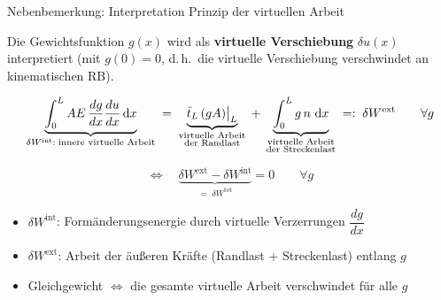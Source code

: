 \documentclass[aspectratio=169,professionalfonts]{beamer}
\newcommand{\dd}{\,\mathrm{d}}
\begin{document}
\begin{frame}{Nebenbemerkung: Interpretation Prinzip der virtuellen Arbeit}

  \small
  Die Gewichtsfunktion $g(x)$ wird als \textbf{virtuelle Verschiebung} $\delta u(x)$ interpretiert
  (mit $g(0)=0$, d.\,h.\ die virtuelle Verschiebung verschwindet an kinematischen RB).

  \vspace{1.0em}
  \begin{center}
  \[
    \underbrace{%
      \int_0^L AE\,\frac{dg}{dx}\frac{du}{dx}\dd x
    }_{\delta W^{\mathrm{int}}:\;\text{innere virtuelle Arbeit}}
    \;=\;
    \underbrace{%
      \bar{t}_L\,(gA)\big|_L
    }_{\substack{\text{virtuelle Arbeit}\\\text{der Randlast}}}
    \;+\;
    \underbrace{%
      \int_0^L g\,n\,\dd x
    }_{\substack{\text{virtuelle Arbeit}\\\text{der Streckenlast}}}
    \;=:\;
    \delta W^{\mathrm{ext}}
    \qquad\forall g
  \]
  \end{center}

  \vspace{0.5em}
  \begin{center}
  \[
    \Longleftrightarrow\quad
    \underbrace{\delta W^{\mathrm{ext}} - \delta W^{\mathrm{int}}}_{=\;\delta W^{\mathrm{tot}}}
    = 0 \qquad \forall g
  \]
  \end{center}

  \vspace{0.5em}
  \begin{itemize}
    \item $\delta W^{\mathrm{int}}$: Formänderungsenergie durch virtuelle Verzerrungen $\dfrac{dg}{dx}$
    \item $\delta W^{\mathrm{ext}}$: Arbeit der äußeren Kräfte (Randlast + Streckenlast) entlang $g$
    \item Gleichgewicht $\Leftrightarrow$ die gesamte virtuelle Arbeit verschwindet für alle $g$
  \end{itemize}

\end{frame}
\end{document}
